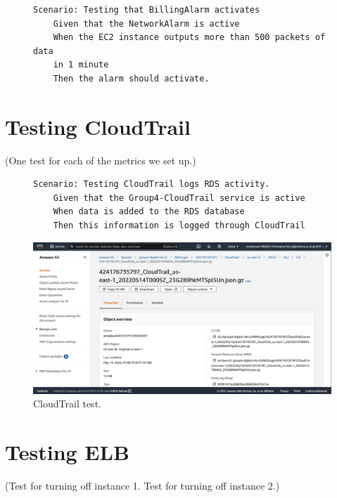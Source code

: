 \begin{figure}[!htbp]
    \centering
    \begin{verbatim}
Scenario: Testing that BillingAlarm activates
    Given that the NetworkAlarm is active
    When the EC2 instance outputs more than 500 packets of data
    in 1 minute
    Then the alarm should activate.
    \end{verbatim}
    \label{fig:cloudwatch-network-alarm-test}
\end{figure}

\section{Testing CloudTrail}\label{sec:testing-cloudtrail}

(One test for each of the metrics we set up.)

\begin{figure}[!htbp]
    \centering
    \begin{verbatim}
Scenario: Testing CloudTrail logs RDS activity.
    Given that the Group4-CloudTrail service is active
    When data is added to the RDS database
    Then this information is logged through CloudTrail
    \end{verbatim}
    \label{fig:cloudtrail-test}
\end{figure}

\begin{figure}[!htbp]
    \centering
    \includegraphics[width=\textwidth]{resources/cloudtrail/cloudtrail-test}
    \caption{CloudTrail test.}
    \label{fig:cloudtrail-test-photo}
\end{figure}


\section{Testing ELB}\label{sec:testing-elb}

(Test for turning off instance 1. Test for turning off instance 2.)